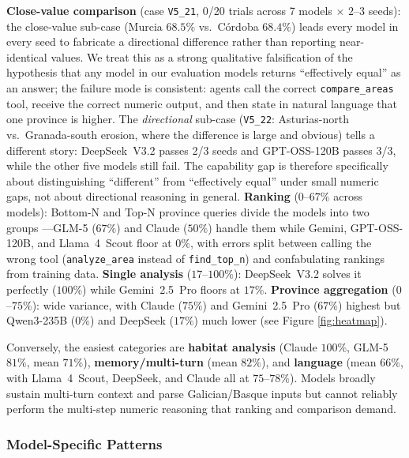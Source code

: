 \documentclass[sigconf]{acmart}
\begin{document}
\textbf{Close-value comparison} (case \texttt{V5\_21}, 0/20 trials across 7 models $\times$ $2$--$3$ seeds): the close-value sub-case (Murcia $68.5\%$ vs.\ C\'{o}rdoba $68.4\%$) leads every model in every seed to fabricate a directional difference rather than reporting near-identical values. We treat this as a strong qualitative falsification of the hypothesis that any model in our evaluation models returns ``effectively equal'' as an answer; the failure mode is consistent: agents call the correct \texttt{compare\_areas} tool, receive the correct numeric output, and then state in natural language that one province is higher. The \emph{directional} sub-case (\texttt{V5\_22}: Asturias-north vs.\ Granada-south erosion, where the difference is large and obvious) tells a different story: DeepSeek~V3.2 passes 2/3 seeds and GPT-OSS-120B passes 3/3, while the other five models still fail. The capability gap is therefore specifically about distinguishing ``different'' from ``effectively equal'' under small numeric gaps, not about directional reasoning in general. \textbf{Ranking} ($0$--$67\%$ across models): Bottom-N and Top-N province queries divide the models into two groups ---GLM-5 ($67\%$) and Claude ($50\%$) handle them while Gemini, GPT-OSS-120B, and Llama~4~Scout floor at $0\%$, with errors split between calling the wrong tool (\texttt{analyze\_area} instead of \texttt{find\_top\_n}) and confabulating rankings from training data. \textbf{Single analysis} ($17$--$100\%$): DeepSeek~V3.2 solves it perfectly ($100\%$) while Gemini~2.5~Pro floors at $17\%$. \textbf{Province aggregation} ($0$--$75\%$): wide variance, with Claude ($75\%$) and Gemini~2.5~Pro ($67\%$) highest but Qwen3-235B ($0\%$) and DeepSeek ($17\%$) much lower (see Figure \ref{fig:heatmap}). 

Conversely, the easiest categories are \textbf{habitat analysis} (Claude $100\%$, GLM-5 $81\%$, mean $71\%$), \textbf{memory/multi-turn} (mean $82\%$), and \textbf{language} (mean $66\%$, with Llama~4~Scout, DeepSeek, and Claude all at $75$--$78\%$). Models broadly sustain multi-turn context and parse Galician/Basque inputs but cannot reliably perform the multi-step numeric reasoning that ranking and comparison demand.

\subsubsection{Model-Specific Patterns}
\end{document}
